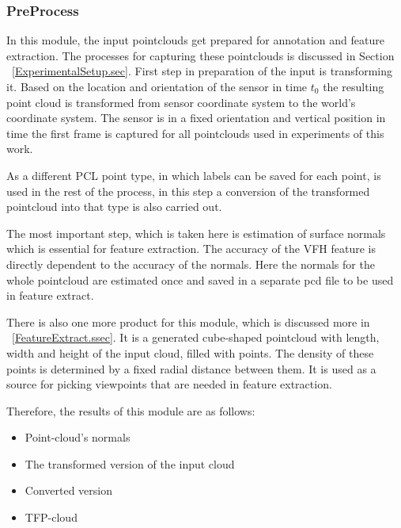 \subsubsection{PreProcess}
\label{PreProcess.ssec}
 In this module, the input pointclouds get prepared for annotation and feature extraction. 
 The processes for capturing these pointclouds is discussed in Section ~\ref{ExperimentalSetup.sec}. 
 First step in preparation of the input is transforming it.
 Based on the location and orientation of the sensor in time $t_0$ the resulting point cloud is transformed from 
 sensor coordinate system to the world's coordinate system.
 The sensor is in a fixed orientation and vertical position in time the first frame is captured for all pointclouds 
 used in experiments of this work.
 
 As a different PCL point type, in which labels can be saved for each point, is used in the rest of the process, 
 in this step a conversion of the transformed pointcloud into that type  is also carried out.
 
 The most important step, which is taken here is estimation of surface normals which is essential for feature extraction. 
 The accuracy of the VFH feature is directly dependent to the accuracy of the normals. 
 Here the normals for the whole pointcloud are estimated once and saved in a separate pcd file to be used in 
 feature extract. 
 
 There is also one more product for this module, which is discussed more in ~\ref{FeatureExtract.ssec}.
 It is a generated cube-shaped pointcloud with length, width and height of the input cloud, filled with points.
 The density of these points is determined by a fixed radial distance between them.
 It is used as a source for picking viewpoints that are needed in feature extraction.
 
 Therefore, the results of this module are as follows:
 \begin{itemize}
  \item Point-cloud's normals
  \item The transformed version of the input cloud
  \item Converted version
  \item TFP-cloud
 \end{itemize}
 
